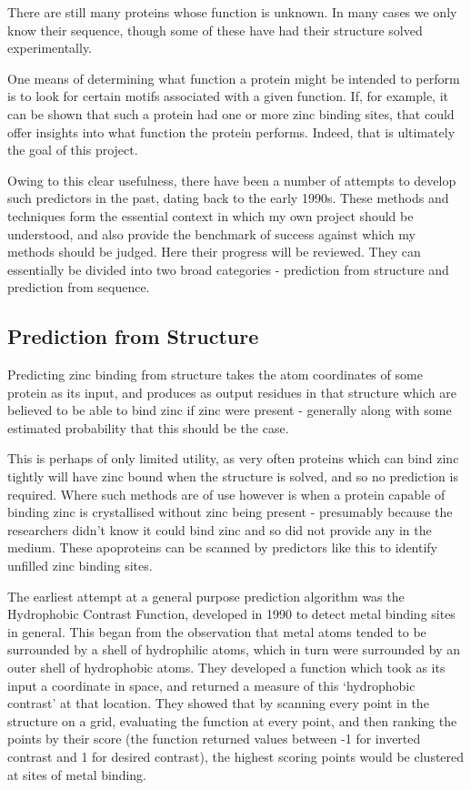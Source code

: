 There are still many proteins whose function is unknown. In many cases we only know their sequence, though some of these have had their structure solved experimentally.

One means of determining what function a protein might be intended to perform is to look for certain motifs associated with a given function. If, for example, it can be shown that such a protein had one or more zinc binding sites, that could offer insights into what function the protein performs. Indeed, that is ultimately the goal of this project.

Owing to this clear usefulness, there have been a number of attempts to develop such predictors in the past, dating back to the early 1990s. These methods and techniques form the essential context in which my own project should be understood, and also provide the benchmark of success against which my methods should be judged. Here their progress will be reviewed. They can essentially be divided into two broad categories - prediction from structure and prediction from sequence.

\subsection{Prediction from Structure}

Predicting zinc binding from structure takes the atom coordinates of some protein as its input, and produces as output residues in that structure which are believed to be able to bind zinc if zinc were present - generally along with some estimated probability that this should be the case.

This is perhaps of only limited utility, as very often proteins which can bind zinc tightly will have zinc bound when the structure is solved, and so no prediction is required. Where such methods are of use however is when a protein capable of binding zinc is crystallised without zinc being present - presumably because the researchers didn't know it could bind zinc and so did not provide any in the medium. These apoproteins can be scanned by predictors like this to identify unfilled zinc binding sites. 


The earliest attempt at a general purpose prediction algorithm was the Hydrophobic Contrast Function, developed in 1990 \cite{yamashita1990metal} to detect metal binding sites in general. This began from the observation that metal atoms tended to be surrounded by a shell of hydrophilic atoms, which in turn were surrounded by an outer shell of hydrophobic atoms. They developed a function which took as its input a coordinate in space, and returned a measure of this `hydrophobic contrast' at that location. They showed that by scanning every point in the structure on a grid, evaluating the function at every point, and then ranking the points by their score (the function returned values between -1 for inverted contrast and 1 for desired contrast), the highest scoring points would be clustered at sites of metal binding.

